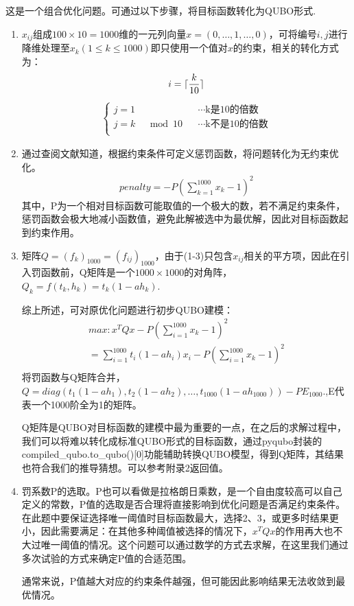 \documentclass{MathorCupmodeling}
\begin{document}
这是一个组合优化问题。可通过以下步骤，将目标函数转化为QUBO形式.
\begin{enumerate}
\item 
$x_{ij}$组成$100\times 10=1000$维的一元列向量$x=(0,\dots,1,\dots,0)$，可将编号$i,j$进行降维处理至$x_{k}(1\le k \le 1000)$即只使用一个值对$x$的约束，相关的转化方式为：
$$
i = \lceil \frac{k}{10}\rceil \\
$$
\begin{gather}
\left\{
\begin{aligned}
j = 1&&&\cdots \mbox{k是10的倍数}\\
j=k &\mod  10 &&\cdots \mbox{k不是10的倍数}\\
\end{aligned}
\right.
\end{gather}
\item
通过查阅文献知道，根据约束条件可定义惩罚函数，将问题转化为无约束优化。
$$
\begin{aligned}
penalty = -P(\sum_{k=1}^{1000}x_{k} -1)^{2}
\end{aligned}
$$
其中，P为一个相对目标函数可能取值的一个极大的数，若不满足约束条件，惩罚函数会极大地减小函数值，避免此解被选中为最优解，因此对目标函数起到约束作用。  
\item
矩阵$Q=(f_{k})_{1000}=(f_{ij})_{1000}$，由于(1-3)只包含$x_{ij}$相关的平方项，因此在引入罚函数前，Q矩阵是一个$1000\times1000$的对角阵，$Q_{k} = f(t_{k},h_{k})=t_{k}(1-ah_{k}).$  

综上所述，可对原优化问题进行初步QUBO建模：
$$
\begin{aligned}
max:x^{T}Qx-P(\sum_{i=1}^{1000}x_{k} -1)^{2}\\
=\sum_{i=1}^{1000}t_{i}(1-ah_{i})x_{i}-P(\sum_{i=1}^{1000}x_{k} -1)^{2}\\
\end{aligned}
$$
将罚函数与Q矩阵合并，$Q=diag(t_{1}(1-ah_{1}),t_{2}(1-ah_{2}),\dots,t_{1000}(1-ah_{1000}))-PE_{1000}.$,E代表一个1000阶全为1的矩阵。

Q矩阵是QUBO对目标函数的建模中最为重要的一点，在之后的求解过程中，我们可以将难以转化成标准QUBO形式的目标函数，通过pyqubo封装的{compiled\_qubo.to\_qubo()[0]}功能辅助转换QUBO模型，得到Q矩阵，其结果也符合我们的推导猜想。可以参考附录2返回值。


\item
罚系数P的选取。P也可以看做是拉格朗日乘数，是一个自由度较高可以自己定义的常数，P值的选取是否合理将直接影响到优化问题是否满足约束条件。在此题中要保证选择唯一阈值时目标函数最大，选择2、3，或更多时结果更小，因此需要满足：在其他多种阈值被选择的情况下，$x^{T}Qx$的作用再大也不大过唯一阈值的情况。这个问题可以通过数学的方式去求解，在这里我们通过多次试验的方式来确定P值的合适范围。

通常来说，P值越大对应的约束条件越强，但可能因此影响结果无法收敛到最优情况。
\end{enumerate}
\end{document}
